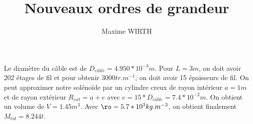 \documentclass[a4paper]{article}
\author{Maxime WIRTH}
\title{Nouveaux ordres de grandeur}
\begin{document}
\maketitle

Le diamètre du câble est de $D_{câble} = 4.950 * 10^{-3} m$.
Pour $L = 3m$, on doit avoir 202 étages de fil et pour obtenir $3000 tr.m^{-1}$, on doit avoir 15 épaisseurs de fil.
On peut approximer notre solénoïde par un cylindre creux de rayon intérieur $a = 1m$ et de rayon extérieur $R_{ext} = a + e$ avec $e = 15 * D_{câble} = 7.4*10^{-2} m$.
On obtient un volume de $V = 1.45 m^3$.
Avec $\ro = 5.7 * 10^3 kg.m^{-3}$, on obtient finalement $M_{tot} = 8.244 t$.
\end{document}
